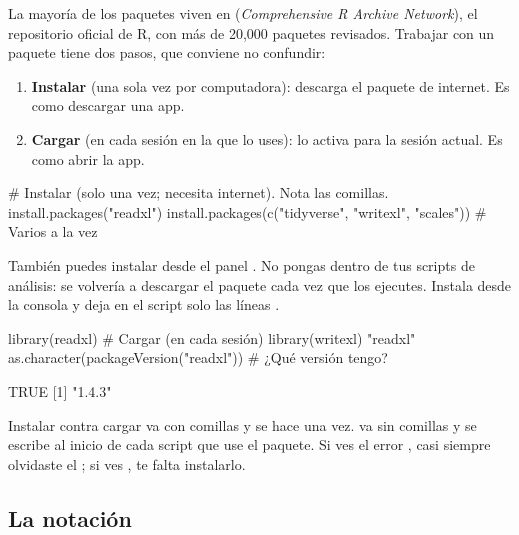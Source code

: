 La mayoría de los paquetes viven en  (\emph{Comprehensive R
Archive Network}), el repositorio oficial de R, con más de 20,000
paquetes revisados. Trabajar con un paquete tiene dos pasos, que conviene
no confundir:

\begin{enumerate}
  \item \textbf{Instalar} (una sola vez por computadora): descarga el
        paquete de internet. Es como descargar una app.
  \item \textbf{Cargar} (en cada sesión en la que lo uses): lo activa para
        la sesión actual. Es como abrir la app.
\end{enumerate}

\begin{rnoejecutar}
# Instalar (solo una vez; necesita internet). Nota las comillas.
install.packages("readxl")
install.packages(c("tidyverse", "writexl", "scales"))  # Varios a la vez
\end{rnoejecutar}

También puedes instalar desde el panel . No pongas
 dentro de tus scripts de análisis: se volvería a
descargar el paquete cada vez que los ejecutes. Instala desde la consola y
deja en el script solo las líneas .

\begin{rcode}
library(readxl)                        # Cargar (en cada sesión)
library(writexl)
"readxl" %
as.character(packageVersion("readxl"))  # ¿Qué versión tengo?
\end{rcode}
\begin{rsalida}
[1] TRUE
[1] "1.4.3"
\end{rsalida}

\begin{concepto}{Instalar contra cargar}
 va con comillas y se hace una vez.
 va sin comillas y se escribe al inicio de cada
script que use el paquete. Si ves el error , casi siempre olvidaste el ; si ves
, te falta instalarlo.
\end{concepto}

\subsection{La notación \texorpdfstring{}{paquete::funcion()}}


